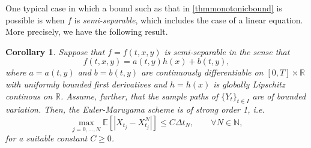 \documentclass[reqno,12pt]{amsart}
\theoremstyle{plain}%
\newtheorem{cor}{Corollary}[section]
\theoremstyle{definition}
\begin{document}
One typical case in which a bound such as that in \cref{thmmonotonicbound} is possible is when $f$ is \emph{semi-separable}, which includes the case of a linear equation. More precisely, we have the following result.

\begin{cor}
    \label{thmsemiseparablemonotonicbound}
  Suppose that $f=f(t, x, y)$ is semi-separable in the sense that
  \begin{equation}
    \label{lineareqform}
    f(t, x, y) = a(t, y)h(x) + b(t, y),
  \end{equation}
  where $a=a(t, y)$ and $b=b(t, y)$ are continuously differentiable on $[0, T]\times \mathbb{R}$ with uniformly bounded first derivatives and $h=h(x)$ is globally Lipschitz continous on $\mathbb{R}$. Assume, further, that the sample paths of $\{Y_t\}_{t\in I}$ are of bounded variation. Then, the Euler-Maruyama scheme is of strong order 1, i.e.
  \begin{equation}
    \max_{j=0, \ldots, N}\mathbb{E}\left[ \left| X_{t_j} - X_{t_j}^N \right| \right] \leq C \Delta t_N, \qquad \forall N \in \mathbb{N},
  \end{equation}
  for a suitable constant $C \geq 0$.
\end{cor}
\end{document}
